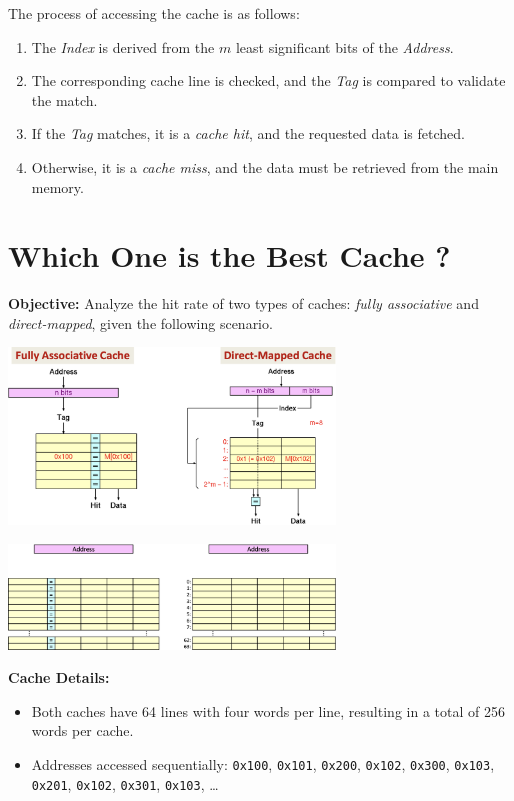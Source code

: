 The process of accessing the cache is as follows:
\begin{enumerate}
    \item The \textit{Index} is derived from the $m$ least significant bits of the \textit{Address}.
    \item The corresponding cache line is checked, and the \textit{Tag} is compared to validate the match.
    \item If the \textit{Tag} matches, it is a \textit{cache hit}, and the requested data is fetched.
    \item Otherwise, it is a \textit{cache miss}, and the data must be retrieved from the main memory.
\end{enumerate}
\newpage
\section{Which One is the Best Cache ?}
\textbf{Objective:} Analyze the hit rate of two types of caches: \textit{fully associative} and \textit{direct-mapped}, given the following scenario.
\begin{center}
    \includegraphics[width=0.65\textwidth]{chapters/chapter3a/images/best.png}
\end{center}
\begin{center}
    \includegraphics[width=0.65\textwidth]{chapters/chapter3a/images/example.png}
\end{center}
\textbf{Cache Details:}
\begin{itemize}
    \item Both caches have 64 lines with four words per line, resulting in a total of 256 words per cache.
    \item Addresses accessed sequentially: \texttt{0x100}, \texttt{0x101}, \texttt{0x200}, \texttt{0x102}, \texttt{0x300}, \texttt{0x103}, \texttt{0x201}, \texttt{0x102}, \texttt{0x301}, \texttt{0x103}, \dots
\end{itemize}

